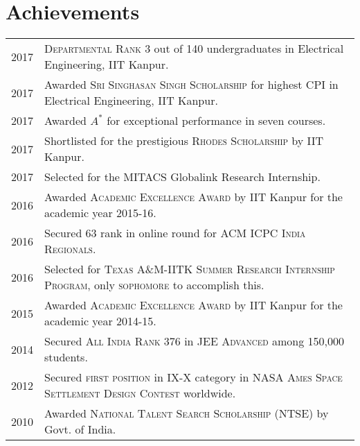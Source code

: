 \documentclass[a4paper,10pt]{article}
\begin{document}
\section{Achievements}
\begin{tabular}{rl}
2017 & \textsc{Departmental Rank 3} out of 140 undergraduates in Electrical
Engineering, IIT Kanpur.\\
2017 & Awarded \textsc{Sri Singhasan Singh Scholarship} for highest CPI in Electrical Engineering, IIT Kanpur.\\
2017 & Awarded $A^*$ for exceptional performance in seven courses.\\
2017 & Shortlisted for the  prestigious \textsc{Rhodes Scholarship} by IIT Kanpur.\\
2017 & Selected for the MITACS Globalink Research Internship. \\
2016 & Awarded \textsc{Academic Excellence Award} by IIT Kanpur for the academic year 2015-16.\\
2016 & Secured 63 rank in online round for \textsc{ACM ICPC India Regionals}.\\
2016 & Selected for \textsc{Texas A\&M-IITK Summer Research Internship Program}, only \textsc{sophomore} to accomplish this.\\
2015 & Awarded \textsc{Academic Excellence Award} by IIT Kanpur for the academic year 2014-15.\\
2014 & Secured \textsc{All India Rank 376} in \textsc{JEE Advanced} among 150,000 students.\\
2012 & Secured \textsc{first position} in IX-X category in \textsc{NASA Ames Space Settlement Design Contest} worldwide.\\
2010 & Awarded \textsc{National Talent Search Scholarship} (NTSE) by Govt. of India.

\end{tabular}
\end{document}
